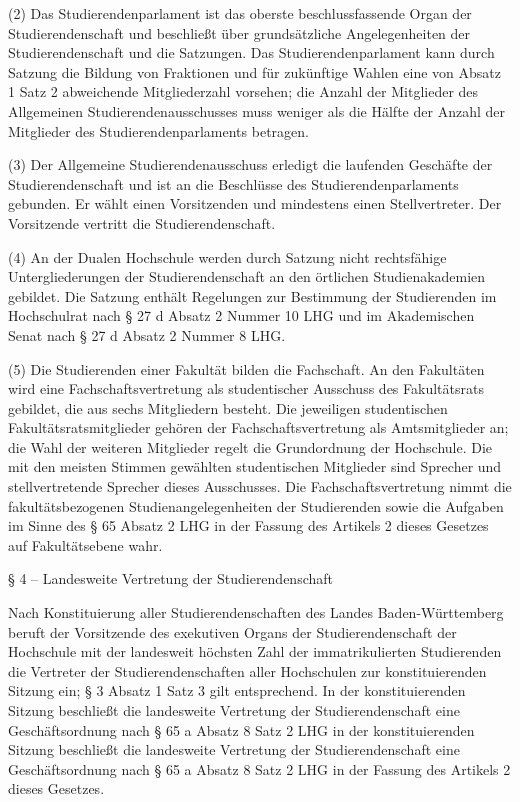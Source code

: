 \documentclass[
10pt,
a4paper,
twoside,								%
titlepage=false,							%
draft=false								%
]{scrartcl}
\begin{document}
(2) Das Studierendenparlament ist das oberste beschlussfassende Organ der Studierendenschaft und beschließt über grundsätzliche Angelegenheiten der Studierendenschaft und die Satzungen. Das Studierendenparlament kann durch Satzung die Bildung von Fraktionen und für zukünftige Wahlen eine von Absatz 1 Satz 2 abweichende Mitgliederzahl vorsehen; die Anzahl der Mitglieder des Allgemeinen Studierendenausschusses muss weniger als die Hälfte der Anzahl der Mitglieder des
Studierendenparlaments betragen.

(3) Der Allgemeine Studierendenausschuss erledigt die laufenden Geschäfte der Studierendenschaft und ist an die Beschlüsse des Studierendenparlaments gebunden. Er wählt einen Vorsitzenden und mindestens einen Stellvertreter. Der Vorsitzende vertritt die Studierendenschaft.

(4) An der Dualen Hochschule werden durch Satzung nicht rechtsfähige Untergliederungen der Studierendenschaft an den örtlichen Studienakademien gebildet. Die Satzung enthält Regelungen zur Bestimmung der Studierenden im Hochschulrat nach § 27 d Absatz 2 Nummer 10 LHG und im Akademischen Senat nach § 27 d Absatz 2 Nummer 8 LHG.

(5) Die Studierenden einer Fakultät bilden die Fachschaft. An den Fakultäten wird eine Fachschaftsvertretung als studentischer Ausschuss des Fakultätsrats gebildet, die aus sechs Mitgliedern besteht. Die jeweiligen studentischen Fakultätsratsmitglieder gehören der Fachschaftsvertretung als Amtsmitglieder an; die Wahl der weiteren Mitglieder regelt die Grundordnung der Hochschule. Die mit den meisten Stimmen gewählten studentischen Mitglieder sind Sprecher und stellvertretende Sprecher dieses Ausschusses. Die Fachschaftsvertretung nimmt die fakultätsbezogenen Studienangelegenheiten der Studierenden sowie die Aufgaben im Sinne des § 65 Absatz 2 LHG in der Fassung des Artikels 2 dieses Gesetzes auf Fakultätsebene wahr.


§ 4 – Landesweite Vertretung der Studierendenschaft

Nach Konstituierung aller Studierendenschaften des Landes Baden-Württemberg beruft der Vorsitzende des exekutiven Organs der Studierendenschaft der Hochschule mit der landesweit höchsten Zahl der immatrikulierten Studierenden die Vertreter der Studierendenschaften aller Hochschulen zur konstituierenden Sitzung ein; § 3 Absatz 1 Satz 3 gilt entsprechend. In der konstituierenden Sitzung beschließt die landesweite Vertretung der Studierendenschaft eine Geschäftsordnung nach § 65 a Absatz 8 Satz 2 LHG in der konstituierenden Sitzung beschließt die landesweite Vertretung der Studierendenschaft eine Geschäftsordnung nach § 65 a Absatz 8 Satz 2 LHG in der Fassung des Artikels 2 dieses Gesetzes.
\end{document}
